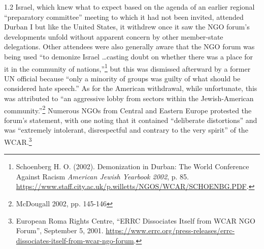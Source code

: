 \documentclass[../unravbook.tex]{subfiles}
\begin{document}
\begin{spacing}{1.2}
Israel, which knew what to expect based on the agenda of an earlier regional ``preparatory committee'' meeting to which it had not been invited, attended Durban I but like the United States, it withdrew once it saw the NGO forum's developments unfold without apparent concern by other member-state delegations. Other attendees were also generally aware that the NGO forum was being used ``to demonize Israel \ldots casting doubt on whether there was a place for it in the community of nations,''\footnote{Schoenberg H. O. (2002). Demonization in Durban: The World Conference Against Racism \textit{American Jewish Yearbook 2002}, p. 85. \url{https://www.staff.city.ac.uk/p.willetts/NGOS/WCAR/SCHOENBG.PDF}.} but this was dismissed afterward by a former UN official because ``only a minority of groups was guilty of what should be considered hate speech.'' As for the American withdrawal, while unfortunate, this was attributed to ``an aggressive lobby from sectors within the Jewish-American community.''\footnote{McDougall 2002, pp. 145-146} Numerous NGOs from Central and Eastern Europe protested  the forum's statement, with one noting that it contained ``deliberate distortions''  and was ``extremely intolerant, disrespectful and contrary to the very spirit'' of the WCAR.\footnote{European Roma Rights Centre, \enquote{ERRC Dissociates Itself from WCAR NGO Forum}, September 5, 2001. \url{https://www.errc.org/press-releases/errc-dissociates-itself-from-wcar-ngo-forum}.} 


\end{spacing}
\end{document}
